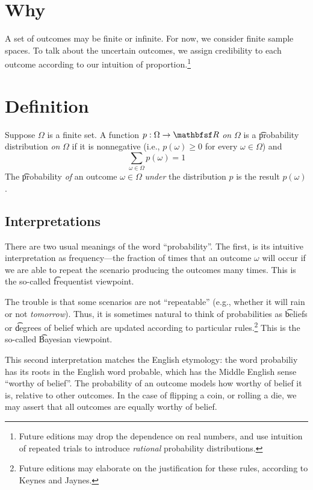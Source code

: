 
\section*{Why}

A set of outcomes may be finite or infinite.
For now, we consider finite sample spaces.
To talk about the uncertain outcomes, we assign credibility to each outcome according to our intuition of proportion.\footnote{Future editions may drop the dependence on real numbers, and use intuition of repeated trials to introduce \textit{rational} probability distributions.}

\section*{Definition}

Suppose $\Omega $ is a finite set.
A function $p: \Omega  \to \R $ \textit{on} $\Omega $ is a \t{probability distribution} \textit{on} $\Omega $ if it is nonnegative (i.e., $p(\omega ) \geq 0$ for every $\omega  \in \Omega $) and
\[
\textstyle
\sum_{\omega  \in \Omega } p(\omega ) = 1
\]
The \t{probability} \textit{of} an outcome $\omega  \in \Omega $ \textit{under} the distribution $p$ is the result $p(\omega )$.

\subsection*{Interpretations}

There are two usual meanings of the word ``probability''.
The first, is its intuitive interpretation as frequency---the fraction of times that an outcome $\omega $ will occur if we are able to repeat the scenario producing the outcomes many times.
This is the so-called \t{frequentist viewpoint}.

The trouble is that some scenarios are not ``repeatable'' (e.g., whether it will rain or not \textit{tomorrow}).
Thus, it is sometimes natural to think of probabilities as \t{beliefs} or \t{degrees of belief} which are updated according to particular rules.\footnote{Future editions may elaborate on the justification for these rules, according to Keynes and Jaynes.}
This is the so-called \t{Bayesian viewpoint}.

This second interpretation matches the English etymology: the word probabiliy has its roots in the English word probable, which has the Middle English sense ``worthy of belief''.
The probability of an outcome models how worthy of belief it is, relative to other outcomes.
In the case of flipping a coin, or rolling a die, we may assert that all outcomes are equally worthy of belief.

